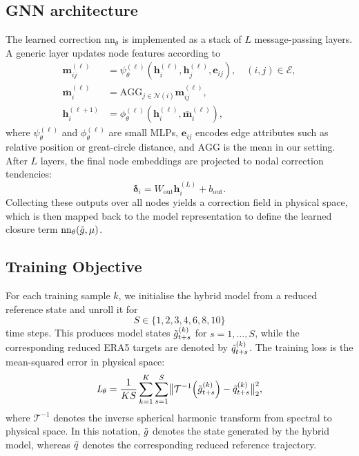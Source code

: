 \subsection{GNN architecture}
The learned correction $\mathrm{nn}_{\theta}$ is implemented as a stack of $L$ message-passing layers. A generic layer updates node features according to
\begin{align}
  \mathbf{m}_{ij}^{(\ell)}
  &= \psi_{\theta}^{(\ell)}\!\left(\mathbf{h}_i^{(\ell)}, \mathbf{h}_j^{(\ell)}, \mathbf{e}_{ij}\right),
  \quad (i,j) \in \mathcal{E}, \\
  \bar{\mathbf{m}}_i^{(\ell)}
  &= \mathrm{AGG}_{j \in \mathcal{N}(i)} \mathbf{m}_{ij}^{(\ell)}, \\
  \mathbf{h}_i^{(\ell+1)}
  &= \phi_{\theta}^{(\ell)}\!\left(\mathbf{h}_i^{(\ell)}, \bar{\mathbf{m}}_i^{(\ell)}\right),
\end{align}
where $\psi_{\theta}^{(\ell)}$ and $\phi_{\theta}^{(\ell)}$ are small MLPs, $\mathbf{e}_{ij}$ encodes edge attributes such as relative position or great-circle distance, and $\mathrm{AGG}$ is the mean in our setting. After $L$ layers, the final node embeddings are projected to nodal correction tendencies:
\begin{equation}
  \boldsymbol{\delta}_i
  =
  W_{\mathrm{out}} \mathbf{h}_i^{(L)} + b_{\mathrm{out}}.
\end{equation}
Collecting these outputs over all nodes yields a correction field in physical space, which is then mapped back to the model representation to define the learned closure term $\mathrm{nn}_{\theta}(\Tilde{g}, \mu)$.

\subsection{Training Objective}
For each training sample $k$, we initialise the hybrid model from a reduced reference state and unroll it for
\[
S \in \{1, 2, 3, 4, 6, 8, 10\}
\]
time steps. This produces model states $\Tilde{g}_{t+s}^{(k)}$ for $s=1,\dots,S$, while the corresponding reduced ERA5 targets are denoted by $\Tilde{q}_{t+s}^{(k)}$. The training loss is the mean-squared error in physical space:
\begin{equation}
  \textit{L}_{\theta}
  =
  \frac{1}{K S}
  \sum_{k=1}^{K}
  \sum_{s=1}^{S}
  \bigl\|
    \mathcal{T}^{-1}\!\left(\Tilde{g}_{t+s}^{(k)}\right)
    -
    \Tilde{q}_{t+s}^{(k)}
  \bigr\|_2^2,
\end{equation}
where $\mathcal{T}^{-1}$ denotes the inverse spherical harmonic transform from spectral to physical space. In this notation, $\Tilde{g}$ denotes the state generated by the hybrid model, whereas $\Tilde{q}$ denotes the corresponding reduced reference trajectory.


